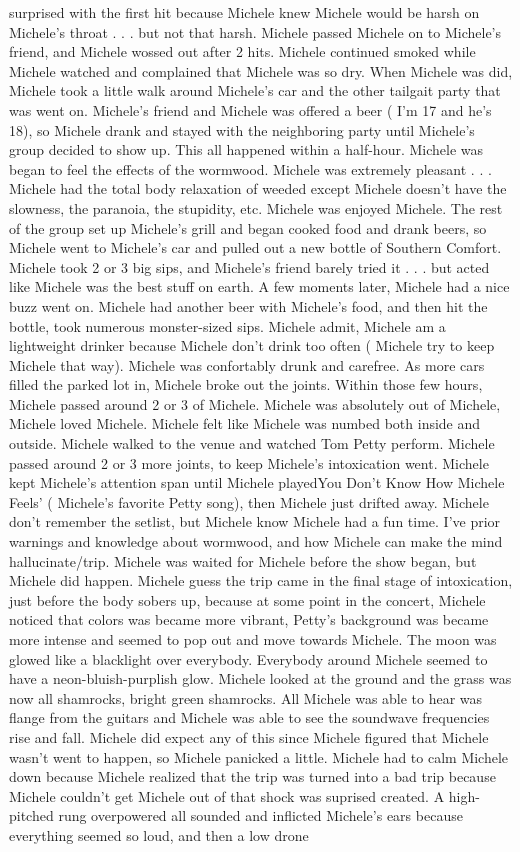 \documentclass[12pt]{book}
\begin{document}
surprised with the first hit because Michele knew Michele would be harsh on Michele's throat . . .  but not that harsh. Michele passed Michele on to Michele's friend, and Michele wossed out after 2 hits. Michele continued smoked while Michele watched and complained that Michele was so dry. When Michele was did, Michele took a little walk around Michele's car and the other tailgait party that was went on. Michele's friend and Michele was offered a beer ( I'm 17 and he's 18), so Michele drank and stayed with the neighboring party until Michele's group decided to show up. This all happened within a half-hour. Michele was began to feel the effects of the wormwood. Michele was extremely pleasant . . .  Michele had the total body relaxation of weeded except Michele doesn't have the slowness, the paranoia, the stupidity, etc. Michele was enjoyed Michele. The rest of the group set up Michele's grill and began cooked food and drank beers, so Michele went to Michele's car and pulled out a new bottle of Southern Comfort. Michele took 2 or 3 big sips, and Michele's friend barely tried it . . .  but acted like Michele was the best stuff on earth. A few moments later, Michele had a nice buzz went on. Michele had another beer with Michele's food, and then hit the bottle, took numerous monster-sized sips. Michele admit, Michele am a lightweight drinker because Michele don't drink too often ( Michele try to keep Michele that way). Michele was confortably drunk and carefree. As more cars filled the parked lot in, Michele broke out the joints. Within those few hours, Michele passed around 2 or 3 of Michele. Michele was absolutely out of Michele, Michele loved Michele. Michele felt like Michele was numbed both inside and outside. Michele walked to the venue and watched Tom Petty perform. Michele passed around 2 or 3 more joints, to keep Michele's intoxication went. Michele kept Michele's attention span until Michele playedYou Don't Know How Michele Feels' ( Michele's favorite Petty song), then Michele just drifted away. Michele don't remember the setlist, but Michele know Michele had a fun time. I've prior warnings and knowledge about wormwood, and how Michele can make the mind hallucinate/trip. Michele was waited for Michele before the show began, but Michele did happen. Michele guess the trip came in the final stage of intoxication, just before the body sobers up, because at some point in the concert, Michele noticed that colors was became more vibrant, Petty's background was became more intense and seemed to pop out and move towards Michele. The moon was glowed like a blacklight over everybody. Everybody around Michele seemed to have a neon-bluish-purplish glow. Michele looked at the ground and the grass was now all shamrocks, bright green shamrocks. All Michele was able to hear was flange from the guitars and Michele was able to see the soundwave frequencies rise and fall. Michele did expect any of this since Michele figured that Michele wasn't went to happen, so Michele panicked a little. Michele had to calm Michele down because Michele realized that the trip was turned into a bad trip because Michele couldn't get Michele out of that shock was suprised created. A high-pitched rung overpowered all sounded and inflicted Michele's ears because everything seemed so loud, and then a low drone 
\end{document}
